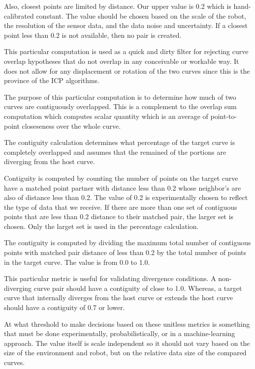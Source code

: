 Also, closest points are limited by distance. Our upper value is 0.2 which is hand-calibrated constant. The value should be chosen based on the scale of the robot, the resolution of the sensor data, and the data noise and uncertainty. If a closest point less than 0.2 is not available, then no pair is created.

This particular computation is used as a quick and dirty filter for rejecting curve overlap hypotheses that do not overlap in any conceivable or workable way. It does not allow for any displacement or rotation of the two curves since this is the province of the ICP algorithms.

The purpose of this particular computation is to determine how much of two curves are contiguously overlapped. This is a complement to the overlap sum computation which computes scalar quantity which is an average of point-to-point closeseness over the whole curve.

The contiguity calculation determines what percentage of the target curve is completely overlapped and assumes that the remained of the portions are diverging from the host curve.

Contiguity is computed by counting the number of points on the target curve have a matched point partner with distance less than 0.2 whose neighbor's are also of distance less than 0.2. The value of 0.2 is experimentally chosen to reflect the type of data that we receive. If there are more than one set of contiguous points that are less than 0.2 distance to their matched pair, the larger set is chosen. Only the larget set is used in the percentage calculation.

The contiguity is computed by dividing the maximum total number of contiguous points with matched pair distance of less than 0.2 by the total number of points in the target curve. The value is from 0.0 to 1.0.

This particular metric is useful for validating divergence conditions. A non-diverging curve pair should have a contiguity of close to 1.0. Whereas, a target curve that internally diverges from the host curve or extends the host curve should have a contiguity of 0.7 or lower.

At what threshold to make decisions based on these unitless metrics is something that must be done experimentally, probabilistically, or in a machine-learning approach. The value itself is scale independent so it should not vary based on the size of the environment and robot, but on the relative data size of the compared curves.

